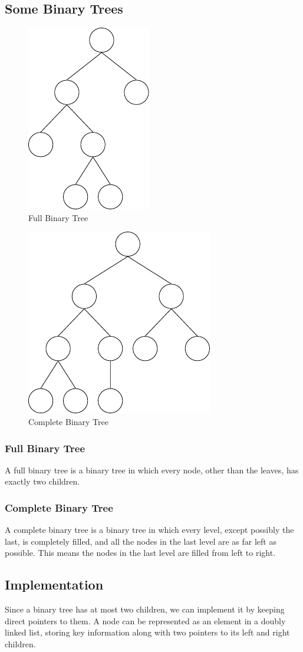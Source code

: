 \subsection{Some Binary Trees}
\begin{minipage}{0.5\textwidth}
  \begin{figure}[H]
    \centering
    \includegraphics[height=0.3\textwidth]{Figure/FBT.pdf}
    \caption*{Full Binary Tree}
  \end{figure}
\end{minipage}
\begin{minipage}{0.5\textwidth}
  \begin{figure}[H]
    \centering
    \includegraphics[height=0.3\textwidth]{Figure/CBT.pdf}
    \caption*{Complete Binary Tree}
  \end{figure}
\end{minipage}
\subsubsection{Full Binary Tree}
A full binary tree is a binary tree in which every node, other than the leaves, has exactly two children.

\subsubsection{Complete Binary Tree}
A complete binary tree is a binary tree in which every level, except possibly the last, is completely filled, and all the nodes in the last level are as far left as possible. This means the nodes in the last level are filled from left to right.

\subsection{Implementation}
Since a binary tree has at most two children, we can implement it by keeping direct pointers to them. A node can be represented as an element in a doubly linked list, storing key information along with two pointers to its left and right children. 


